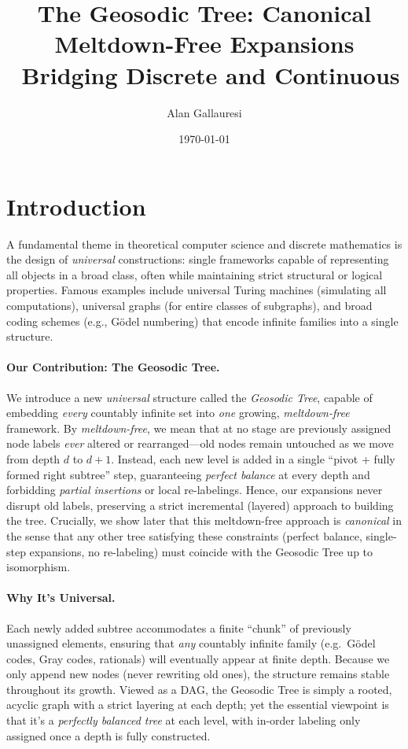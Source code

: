 \documentclass[acmsmall]{acmart}
\title{The Geosodic Tree: Canonical Meltdown-Free Expansions \ Bridging Discrete and Continuous}
\author{Alan Gallauresi}
\affiliation{
  \institution{Independent Researcher}
  \city{College Park}
  \country{United States}
}
\date{\today}
\theoremstyle{definition}
\theoremstyle{remark}
\begin{document}
\maketitle



\section{Introduction}
\label{sec:intro}

A fundamental theme in theoretical computer science and discrete mathematics 
is the design of \emph{universal} constructions: single frameworks capable 
of representing all objects in a broad class, often while maintaining 
strict structural or logical properties. Famous examples include 
universal Turing machines (simulating all computations), universal graphs 
(for entire classes of subgraphs), and broad coding schemes 
(e.g., G\"odel numbering) that encode infinite families into a single structure.

\paragraph{Our Contribution: The Geosodic Tree.}
We introduce a new \emph{universal} structure called the \emph{Geosodic Tree}, 
capable of embedding \emph{every} countably infinite set into \emph{one} 
growing, \emph{meltdown-free} framework. By \emph{meltdown-free}, we mean 
that at no stage are previously assigned node labels \emph{ever} altered 
or rearranged---old nodes remain untouched as we move from depth $d$ 
to $d+1$. Instead, each new level is added in a single ``pivot + fully formed 
right subtree'' step, guaranteeing \emph{perfect balance} at every depth 
and forbidding \emph{partial insertions} or local re-labelings. 
Hence, our expansions never disrupt old labels, preserving a strict 
incremental (layered) approach to building the tree.  Crucially, we show later that this meltdown-free
approach is \emph{canonical} in the sense that any other tree satisfying
these constraints (perfect balance, single-step expansions, no re-labeling)
must coincide with the Geosodic Tree up to isomorphism.

\paragraph{Why It’s Universal.}
Each newly added subtree accommodates a finite ``chunk'' of previously unassigned elements, 
ensuring that \emph{any} countably infinite family 
(e.g.\ G\"odel codes, Gray codes, rationals) 
will eventually appear at finite depth. Because we only append new nodes (never rewriting old ones),
the structure remains stable throughout its growth. Viewed as a DAG, the Geosodic Tree 
is simply a rooted, acyclic graph with a strict layering at each depth; yet the essential 
viewpoint is that it’s a \emph{perfectly balanced tree} at each level, with in-order labeling 
only assigned once a depth is fully constructed.
\end{document}
